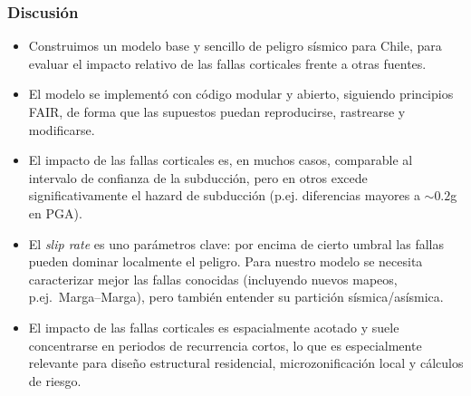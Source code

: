 \documentclass[9pt,ignorenonframetext,mathserif,aspectratio=169,xcolor=dvipsnames]{beamer}
\begin{document}
\begin{frame}[t]\frametitle{Discusión}


\begin{itemize}
  \item Construimos un modelo base y sencillo de peligro sísmico para Chile,
        para evaluar el impacto relativo de las fallas corticales
        frente a otras fuentes.

  \item El modelo se implementó con código modular y abierto, siguiendo
        principios FAIR, de forma que las supuestos puedan
        reproducirse, rastrearse y modificarse.

  \item El impacto de las fallas corticales es, en muchos casos, comparable
        al intervalo de confianza de la subducción, pero en otros excede
        significativamente el hazard de subducción (p.ej. diferencias
        mayores a $\sim 0.2$g en PGA).

  \item El \emph{slip rate} es uno parámetros clave: por
        encima de cierto umbral las fallas pueden dominar localmente el
        peligro. Para nuestro modelo se necesita caracterizar
        mejor las fallas conocidas (incluyendo nuevos mapeos, p.ej.\ Marga--Marga), pero también entender
        su partición sísmica/asísmica.

  \item El impacto de las fallas corticales es espacialmente acotado y
        suele concentrarse en periodos de recurrencia cortos, lo que es
        especialmente relevante para diseño estructural residencial, microzonificación
        local y cálculos de riesgo.
\end{itemize}

\end{frame}
\end{document}
